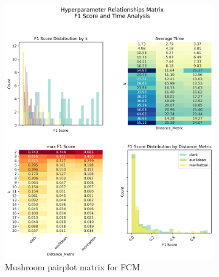 \begin{figure}[H]
\centering
\begin{subfigure}{0.49\textwidth}
\centering
\includegraphics[width=\linewidth]{figures/mushroom_hyperparameter_pairplot_matrix.png}
\caption{Mushroom pairplot matrix for FCM}
\end{subfigure}
\hfill
\begin{subfigure}{0.49\textwidth}
\centering

\end{subfigure}
\end{figure}
